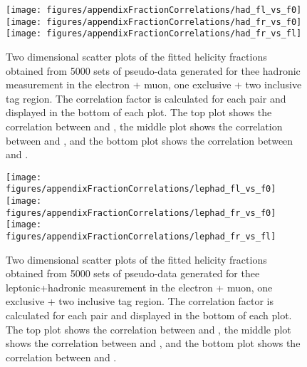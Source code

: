 \begin{figure}[!hb]
\begin{center}
        \texttt{[image: figures/appendixFractionCorrelations/had\_fl\_vs\_f0]}\\
        \texttt{[image: figures/appendixFractionCorrelations/had\_fr\_vs\_f0]}\\
        \texttt{[image: figures/appendixFractionCorrelations/had\_fr\_vs\_fl]}
        
\caption{Two dimensional scatter plots of the fitted helicity fractions obtained from 5000 sets of pseudo-data generated for thee hadronic measurement in the electron + muon, one exclusive + two inclusive \bt tag region. The correlation factor is calculated for each pair and displayed in the bottom of each plot. The top plot shows the correlation between \fo and \fl, the middle plot shows the correlation between \fo and \fr, and the bottom plot shows the correlation between \fl and \fr.}
\label{fig:hadronic2Dcorrelation}
\end{center}
\end{figure}

\begin{figure}[!hb]
\begin{center}
        \texttt{[image: figures/appendixFractionCorrelations/lephad\_fl\_vs\_f0]}\\
        \texttt{[image: figures/appendixFractionCorrelations/lephad\_fr\_vs\_f0]}\\
        \texttt{[image: figures/appendixFractionCorrelations/lephad\_fr\_vs\_fl]}
        
\caption{Two dimensional scatter plots of the fitted helicity fractions obtained from 5000 sets of pseudo-data generated for thee leptonic+hadronic measurement in the electron + muon, one exclusive + two inclusive \bt tag region. The correlation factor is calculated for each pair and displayed in the bottom of each plot. The top plot shows the correlation between \fo and \fl, the middle plot shows the correlation between \fo and \fr, and the bottom plot shows the correlation between \fl and \fr.}
\label{fig:lephad2Dcorrelation}
\end{center}
\end{figure}
